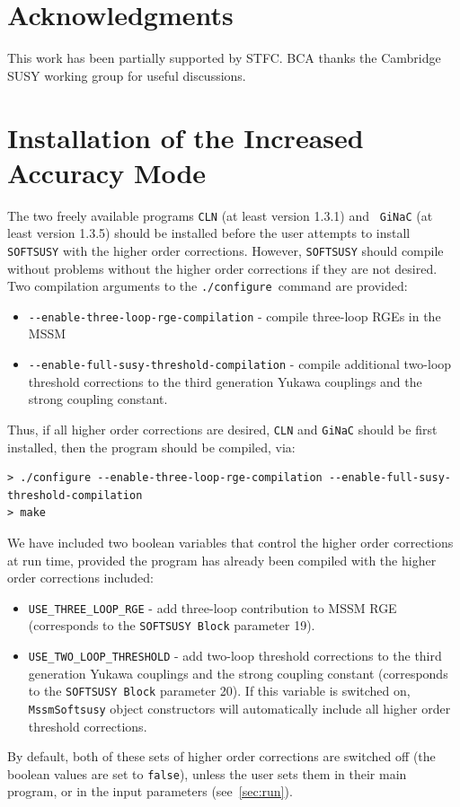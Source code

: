 \documentclass[final,3p,times,pdflatex]{elsarticle}
\def\code#1{{\tt #1}}
\begin{document}
\section*{Acknowledgments}
This work has been partially supported by STFC. BCA thanks the Cambridge SUSY
working group for useful discussions.

\appendix

\section{Installation of the Increased Accuracy Mode}
\label{sec:install}

The two freely available programs {\tt CLN} (at least version 1.3.1) and {\tt
  GiNaC} (at least version 1.3.5) should be installed before the user attempts
to install {\tt SOFTSUSY} with the higher order corrections. However, 
{\tt SOFTSUSY} should compile without problems without the higher order
corrections if they are not desired. 
Two compilation arguments to the {\tt ./configure}~command are provided:
\begin{itemize}
	\item[] \verb|--enable-three-loop-rge-compilation| - compile three-loop RGEs in the MSSM 
	\item[] \verb|--enable-full-susy-threshold-compilation| - compile
          additional two-loop threshold corrections to the third generation
          Yukawa couplings and the strong coupling constant.
\end{itemize}
Thus, if all higher order corrections are desired, {\tt CLN} and {\tt GiNaC}
should be first installed, then 
the program should be
compiled, via:
\begin{verbatim}
> ./configure --enable-three-loop-rge-compilation --enable-full-susy-threshold-compilation
> make
\end{verbatim}

We have included two boolean variables that control the higher order
corrections  at run time, provided the program has already been compiled with 
the higher order corrections included:
\begin{itemize}
	\item \verb|USE_THREE_LOOP_RGE|  - add three-loop contribution to
          MSSM RGE (corresponds to the \code{SOFTSUSY Block} parameter 19). 
	\item \verb|USE_TWO_LOOP_THRESHOLD| - add two-loop threshold
          corrections to the third generation Yukawa couplings and the strong
          coupling constant 
          (corresponds to the \code{SOFTSUSY Block} parameter 20). If this
          variable is switched on, {\tt MssmSoftsusy} object constructors will 
          automatically include all higher order threshold corrections.
\end{itemize}
By default, both of these sets of higher order corrections are switched off 
(the boolean values are set to {\tt false}), unless the user sets them in
their main program, or in the input parameters (see~\ref{sec:run}). 
\end{document}
